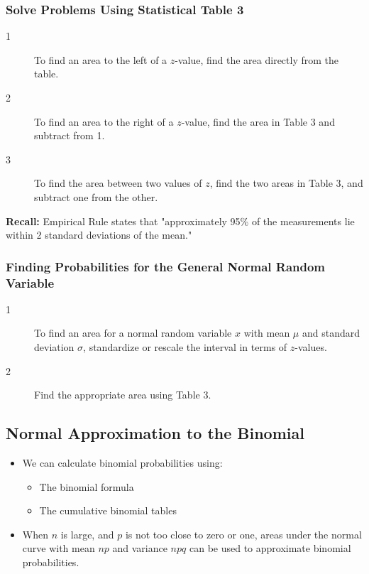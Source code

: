 \documentclass[12pt, letterpaper]{article}
\begin{document}
            \subsubsection{Solve Problems Using Statistical Table 3}
                \begin{description}
                    \item[1] To find an area to the left of a $z$-value, find the area directly from the table.
                    \item[2] To find an area to the right of a $z$-value, find the area in Table 3 and subtract from 1.
                    \item[3] To find the area between two values of $z$, find the two areas in Table 3, and subtract one from the other.
                \end{description}
                \textbf{Recall:} Empirical Rule states that "approximately 95\% of the measurements lie within 2 standard deviations of the mean."
            \subsubsection{Finding Probabilities for the General Normal Random Variable}
                \begin{description}
                    \item[1] To find an area for a normal random variable $x$ with mean $\mu$ and standard deviation $\sigma$, standardize or rescale the interval in terms of $z$-values.
                    \item[2] Find the appropriate area using Table 3.
                \end{description}
        \subsection{Normal Approximation to the Binomial}
            \begin{itemize}
                \item We can calculate binomial probabilities using:
                \begin{itemize}
                    \item The binomial formula
                    \item The cumulative binomial tables
                \end{itemize}
                \item When $n$ is large, and $p$ is not too close to zero or one, areas under the normal curve with mean $np$ and variance $npq$ can be used to approximate binomial probabilities.
            \end{itemize}
\end{document}
